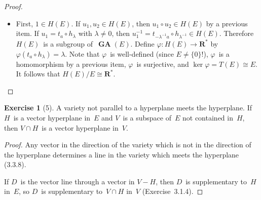 \documentclass[letterpaper,12pt]{article}
\newcommand{\R}{\mathbf{R}}
\newcommand{\Rnz}{\R^*}
\newcommand{\iso}{\cong}
\newcommand{\sect}{\cap}
\newcommand{\after}{\circ}
\DeclareMathOperator{\GA}{\mathbf{GA}}
\newcommand{\inv}[1]{#1^{-1}}
\theoremstyle{definition}
\newtheorem*{exer}{Exercise}
\theoremstyle{remark}
\begin{document}
\begin{proof}
\begin{itemize}[itemsep=0pt]
\item First, \(1\in H(E)\). If \(u_1,u_2\in H(E)\), then \(u_1\after u_2\in H(E)\) by a previous item. If \(u_1=t_a\after h_{\lambda}\) with \(\lambda\ne0\), then \(\inv{u_1}=t_{-\lambda^{-1}a}\after h_{\lambda^{-1}}\in H(E)\). Therefore \(H(E)\)~is a subgroup of~\(\GA(E)\). Define \(\varphi:H(E)\to\Rnz\) by \(\varphi(t_a\after h_{\lambda})=\lambda\). Note that \(\varphi\)~is well-defined (since \(E\ne\{0\}\)!), \(\varphi\)~is a homomorphism by a previous item, \(\varphi\)~is surjective, and \(\ker\varphi=T(E)\iso E\). It follows that \(H(E)/E\iso\Rnz\).\qedhere
\end{itemize}
\end{proof}

\begin{exer}[5]
A variety not parallel to a hyperplane meets the hyperplane. If \(H\)~is a vector hyperplane in~\(E\) and \(V\)~is a subspace of~\(E\) not contained in~\(H\), then \(V\sect H\)~is a vector hyperplane in~\(V\).
\end{exer}
\begin{proof}
Any vector in the direction of the variety which is not in the direction of the hyperplane determines a line in the variety which meets the hyperplane (3.3.8).

If \(D\)~is the vector line through a vector in \(V-H\), then \(D\)~is supplementary to~\(H\) in~\(E\), so \(D\)~is supplementary to~\(V\sect H\) in~\(V\) (Exercise~3.1.4).
\end{proof}
\end{document}
